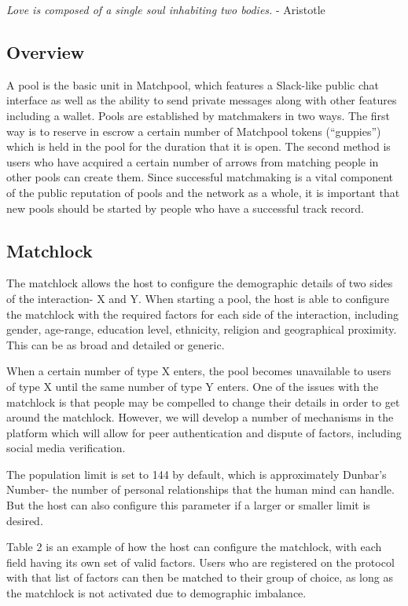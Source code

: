 \documentclass[a4paper]{article}
\begin{document}
\textit{Love is composed of a single soul inhabiting two bodies.} - Aristotle

\subsection{Overview}
A pool is the basic unit in Matchpool, which features a Slack-like public chat interface as well as the ability to send private messages along with other features including a wallet. Pools are established by matchmakers in two ways. The first way is to reserve in escrow a certain number of Matchpool tokens (“guppies”) which is held in the pool for the duration that it is open. The second method is users who have acquired a certain number of arrows from matching people in other pools can create them. Since successful matchmaking is a vital component of the public reputation of pools and the network as a whole, it is important that new pools should be started by people who have a successful track record.

\subsection{Matchlock}
The matchlock allows the host to configure the demographic details of two sides of the interaction- X and Y. When starting a pool, the host is able to configure the matchlock with the required factors for each side of the interaction, including gender, age-range, education level, ethnicity, religion and geographical proximity. This can be as broad and detailed or generic.

When a certain number of type X enters, the pool becomes unavailable to users of type X until the same number of type Y enters. One of the issues with the matchlock is that people may be compelled to change their details in order to get around the matchlock. However, we will develop a number of mechanisms in the platform which will allow for peer authentication and dispute of factors, including social media verification.

The population limit is set to 144 by default, which is approximately Dunbar’s Number- the number of personal relationships that the human mind can handle. But the host can also configure this parameter if a larger or smaller limit is desired.

Table 2 is an example of how the host can configure the matchlock, with each field having its own set of valid factors. Users who are registered on the protocol with that list of factors can then be matched to their group of choice, as long as the matchlock is not activated due to demographic imbalance.
\end{document}
